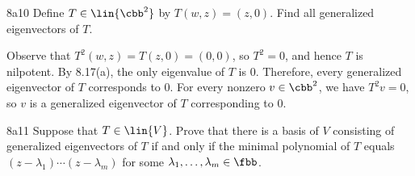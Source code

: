 \begin{exercise}{8a10}
    Define $T \in \lin{\cbb^2}$ by $T(w, z) = (z, 0)$.
    Find all generalized eigenvectors of $T$.
\end{exercise}

\begin{sol}
    Observe that $T^2(w, z) = T(z, 0) = (0, 0)$, so $T^2 = 0$, and hence $T$ is nilpotent.
    By 8.17(a), the only eigenvalue of $T$ is $0$.
    Therefore, every generalized eigenvector of $T$ corresponds to $0$.
    For every nonzero $v \in \cbb^2$, we have $T^2 v = 0$, so $v$ is a generalized eigenvector of $T$ corresponding to $0$.
\end{sol}

\begin{exercise}{8a11}
    Suppose that $T \in \lin{V}$.
    Prove that there is a basis of $V$ consisting of generalized eigenvectors of $T$ if and only if the minimal polynomial of $T$ equals $(z - \lambda_1) \cdots (z - \lambda_m)$ for some $\lambda_1, \ldots, \lambda_m \in \fbb$.


\end{exercise}


